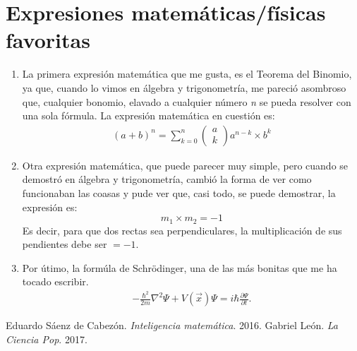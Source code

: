 \documentclass[12pt]{article}
\begin{document}
\section{Expresiones matemáticas/físicas favoritas}
	\begin{enumerate}
		\item La primera expresión matemática que me gusta, es el Teorema del Binomio, ya que, cuando lo vimos en álgebra y trigonometría, me pareció asombroso que, cualquier bonomio, elavado a cualquier número \emph{n} se pueda resolver con una sola fórmula. La expresión matemática en cuestión es:
		\begin{align*}
			(a+b)^{n} = \sum^{n}_{k=0} \begin{pmatrix}
		a \\ k \end{pmatrix} a^{n-k} \times b^{k}
		\end{align*}
		\item Otra expresión matemática, que puede parecer muy simple, pero cuando se demostró en álgebra y trigonometría, cambió la forma de ver como funcionaban las coasas y pude ver que, casi todo, se puede demostrar, la expresión es: 
		\begin{equation*}
		m_{1} \times m_{2} = -1
		\end{equation*}
		Es decir, para que dos rectas sea perpendiculares, la multiplicación de sus pendientes debe ser $=-1$.
		\item Por útimo, la formúla de Schrödinger, una de las más bonitas que me ha tocado escribir. 
		\begin{align*}
		-\frac{\hbar^2}{2m}\nabla^2\Psi+V(\vec{x}) \Psi=i\hbar\frac{\partial\Psi}{\partial t}.
		\end{align*}
	\end{enumerate}
\begin{thebibliography}{99}
	 Eduardo Sáenz de Cabezón. \emph{Inteligencia matemática}. 2016.
	 Gabriel León. \emph{La Ciencia Pop}. 2017.
\end{thebibliography}
\end{document}
